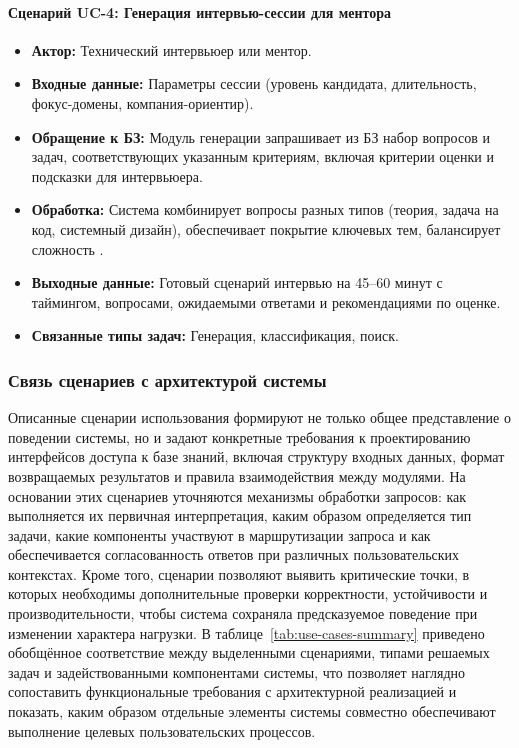 \paragraph{Сценарий UC-4: Генерация интервью-сессии для ментора}

\begin{itemize}
    \item \textbf{Актор:} Технический интервьюер или ментор.
    \item \textbf{Входные данные:} Параметры сессии (уровень кандидата, длительность, фокус-домены, компания-ориентир).
    \item \textbf{Обращение к БЗ:} Модуль генерации запрашивает из БЗ набор вопросов и задач, соответствующих указанным критериям, включая критерии оценки и подсказки для интервьюера.
    \item \textbf{Обработка:} Система комбинирует вопросы разных типов (теория, задача на код, системный дизайн), обеспечивает покрытие ключевых тем, балансирует сложность \cite{Xu2020}.
    \item \textbf{Выходные данные:} Готовый сценарий интервью на 45–60 минут с таймингом, вопросами, ожидаемыми ответами и рекомендациями по оценке.
    \item \textbf{Связанные типы задач:} Генерация, классификация, поиск.
\end{itemize}

\subsubsection*{Связь сценариев с архитектурой системы}

Описанные сценарии использования формируют не только общее представление о поведении системы, но и задают конкретные требования к проектированию интерфейсов доступа к базе знаний, включая структуру входных данных, формат возвращаемых результатов и правила взаимодействия между модулями. На основании этих сценариев уточняются механизмы обработки запросов: как выполняется их первичная интерпретация, каким образом определяется тип задачи, какие компоненты участвуют в маршрутизации запроса и как обеспечивается согласованность ответов при различных пользовательских контекстах. Кроме того, сценарии позволяют выявить критические точки, в которых необходимы дополнительные проверки корректности, устойчивости и производительности, чтобы система сохраняла предсказуемое поведение при изменении характера нагрузки. В таблице~\ref{tab:use-cases-summary} приведено обобщённое соответствие между выделенными сценариями, типами решаемых задач и задействованными компонентами системы, что позволяет наглядно сопоставить функциональные требования с архитектурной реализацией и показать, каким образом отдельные элементы системы совместно обеспечивают выполнение целевых пользовательских процессов.


